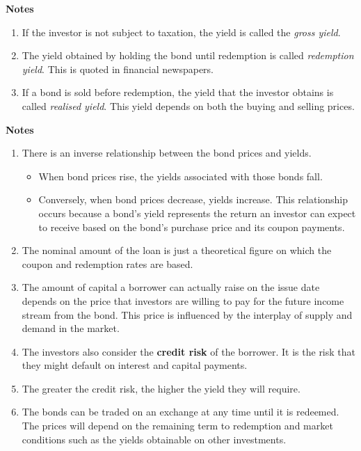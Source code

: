 \documentclass[
]{book}
\providecommand{\tightlist}{%
  \setlength{\itemsep}{0pt}\setlength{\parskip}{0pt}}
\theoremstyle{definition}
\theoremstyle{definition}
\theoremstyle{definition}
\theoremstyle{definition}
\theoremstyle{remark}
\begin{document}
\textbf{Notes}

\begin{enumerate}
\def\labelenumi{\arabic{enumi}.}
\item
  If the investor is not subject to taxation, the yield is called the
  \emph{gross yield}.
\item
  The yield obtained by holding the bond until redemption is called
  \emph{redemption yield}. This is quoted in financial newspapers.
\item
  If a bond is sold before redemption, the yield that the investor
  obtains is called \emph{realised yield}. This yield depends on both the
  buying and selling prices.
\end{enumerate}

\textbf{Notes}

\begin{enumerate}
\def\labelenumi{\arabic{enumi}.}
\item
  There is an inverse relationship between the bond prices and yields.

  \begin{itemize}
  \tightlist
  \item
    When bond prices rise, the yields associated with those bonds fall.
  \item
    Conversely, when bond prices decrease, yields increase. This relationship occurs because a bond's yield represents the return an investor can expect to receive based on the bond's purchase price and its coupon payments.
  \end{itemize}
\item
  The nominal amount of the loan is just a theoretical figure on which
  the coupon and redemption rates are based.
\item
  The amount of capital a borrower can actually raise on the issue date depends on the price that investors are willing to pay for the future income stream from the bond. This price is influenced by the interplay of supply and demand in the market.
\item
  The investors also consider the \textbf{credit risk} of the borrower. It
  is the risk that they might default on interest and capital
  payments.
\item
  The greater the credit risk, the higher the yield they will require.
\item
  The bonds can be traded on an exchange at any time until it is
  redeemed. The prices will depend on the remaining term to redemption
  and market conditions such as the yields obtainable on other
  investments.
\end{enumerate}
\end{document}
